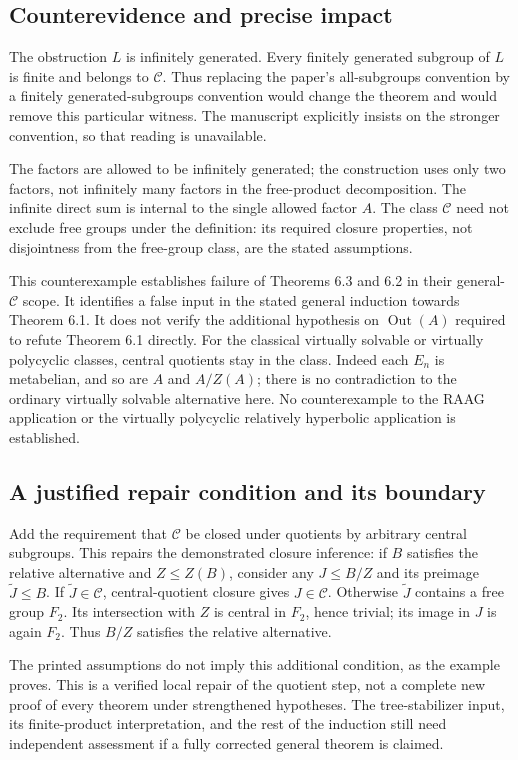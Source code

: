 \documentclass[10pt]{article}
\begin{document}
\subsection*{Counterevidence and precise impact}
The obstruction \(L\) is infinitely generated. Every finitely generated subgroup of \(L\) is finite and belongs to \(\mathcal C\). Thus replacing the paper’s all-subgroups convention by a finitely generated-subgroups convention would change the theorem and would remove this particular witness. The manuscript explicitly insists on the stronger convention, so that reading is unavailable.\par
The factors are allowed to be infinitely generated; the construction uses only two factors, not infinitely many factors in the free-product decomposition. The infinite direct sum is internal to the single allowed factor \(A\). The class \(\mathcal C\) need not exclude free groups under the definition: its required closure properties, not disjointness from the free-group class, are the stated assumptions.\par
This counterexample establishes failure of Theorems 6.3 and 6.2 in their general-\(\mathcal C\) scope. It identifies a false input in the stated general induction towards Theorem 6.1. It does not verify the additional hypothesis on \(\operatorname{Out}(A)\) required to refute Theorem 6.1 directly. For the classical virtually solvable or virtually polycyclic classes, central quotients stay in the class. Indeed each \(E_n\) is metabelian, and so are \(A\) and \(A/Z(A)\); there is no contradiction to the ordinary virtually solvable alternative here. No counterexample to the RAAG application or the virtually polycyclic relatively hyperbolic application is established.\par
\subsection*{A justified repair condition and its boundary}
Add the requirement that \(\mathcal C\) be closed under quotients by arbitrary central subgroups. This repairs the demonstrated closure inference: if \(B\) satisfies the relative alternative and \(Z\leq Z(B)\), consider any \(J\leq B/Z\) and its preimage \(\widetilde J\leq B\). If \(\widetilde J\in\mathcal C\), central-quotient closure gives \(J\in\mathcal C\). Otherwise \(\widetilde J\) contains a free group \(F_2\). Its intersection with \(Z\) is central in \(F_2\), hence trivial; its image in \(J\) is again \(F_2\). Thus \(B/Z\) satisfies the relative alternative.\par
The printed assumptions do not imply this additional condition, as the example proves. This is a verified local repair of the quotient step, not a complete new proof of every theorem under strengthened hypotheses. The tree-stabilizer input, its finite-product interpretation, and the rest of the induction still need independent assessment if a fully corrected general theorem is claimed.\par
\end{document}
